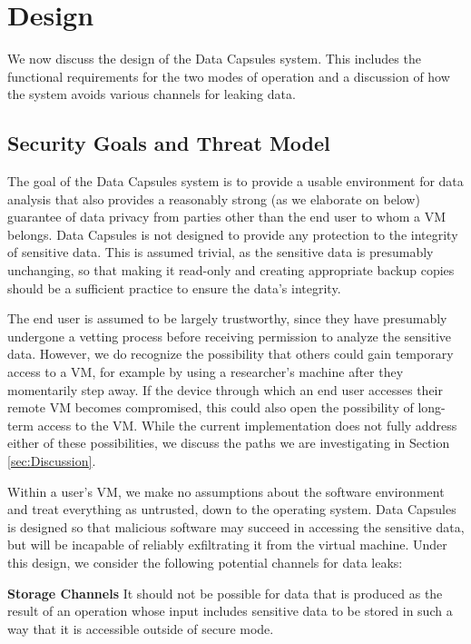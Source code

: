 \documentclass{acm_proc_article-sp}
\begin{document}
\section{Design}

We now discuss the design of the Data Capsules system.  This includes the
functional requirements for the two modes of operation and a discussion of how
the system avoids various channels for leaking data.

\subsection{Security Goals and Threat Model}
\label{sec:Threat Model}

The goal of the Data Capsules system is to provide a usable environment for data
analysis that also provides a reasonably strong (as we elaborate on below)
guarantee of data privacy from parties other than the end user to whom a VM
belongs.  Data Capsules is not designed to provide any protection to the
integrity of sensitive data.  This is assumed trivial, as the sensitive data is
presumably unchanging, so that making it read-only and creating appropriate
backup copies should be a sufficient practice to ensure the data's integrity.

The end user is assumed to be largely trustworthy, since they have presumably
undergone a vetting process before receiving permission to analyze the sensitive
data.  However, we do recognize the possibility that others could gain temporary
access to a VM, for example by using a researcher's machine after they
momentarily step away.  If the device through which an end user accesses their
remote VM becomes compromised, this could also open the possibility of long-term
access to the VM.  While the current implementation does not fully address
either of these possibilities, we discuss the paths we are investigating in
Section \ref{sec:Discussion}. 

Within a user's VM, we make no assumptions about the software environment and
treat everything as untrusted, down to the operating system.  Data Capsules is
designed so that malicious software may succeed in accessing the sensitive data,
but will be incapable of reliably exfiltrating it from the virtual machine.
Under this design, we consider the following potential channels for data leaks:

\textbf{Storage Channels} It should not be possible for data that is produced
as the result of an operation whose input includes sensitive data to be stored
in such a way that it is accessible outside of secure mode.
\end{document}
